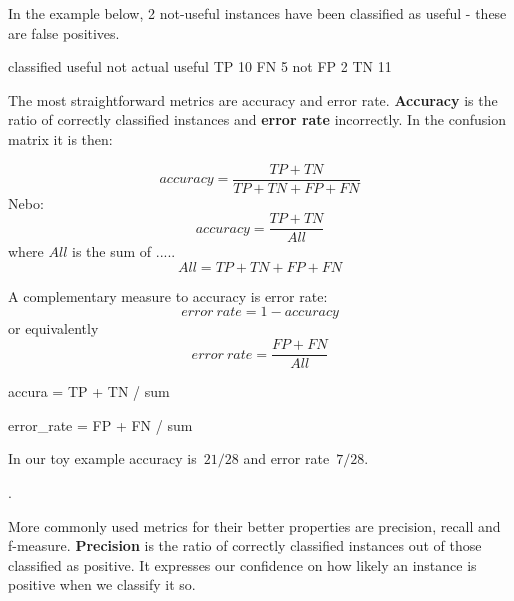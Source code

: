 
In the example below, 2 not-useful instances have been classified as useful -  these are false positives.

\begin{code}
        classified    useful       not
actual
useful                TP 10        FN  5
not                   FP  2        TN  11
\end{code}


The most straightforward metrics are accuracy and error rate.
{\bf Accuracy} is the ratio of correctly classified instances and {\bf error rate} incorrectly.
In the confusion matrix it is then:

\newcommand\TP{\mathit{TP}}  %
\newcommand\TN{\mathit{TN}}
\newcommand\FP{\mathit{FP}}
\newcommand\FN{\mathit{FN}}
\newcommand\ALL{\mathit{All}}
\begin{equation}
\mathit{accuracy} = \frac{\TP + \TN}{\TP + \TN + \FP + \FN}
\end{equation}
Nebo:
\begin{equation}
\mathit{accuracy} = \frac{\TP + \TN}{\ALL}
\end{equation}
where $\ALL$ is the sum of .....
\begin{equation}
\ALL = \TP + \TN + \FP + \FN
\end{equation}

A complementary measure to accuracy is error rate:
\begin{equation}
\mathit{error~rate} = 1 - \mathit{accuracy}
\end{equation}
or equivalently
\begin{equation}
\mathit{error~rate} = \frac{\FP + \FN}{\ALL}
\end{equation}



accura = TP + TN / sum

error\_rate = FP + FN / sum

In our toy example accuracy is~$21/28$ and error rate~$7/28$.

.

More commonly used metrics for their better properties are precision, recall and f-measure.
{\bf Precision} is the ratio of correctly classified instances out of those classified as positive.
It expresses our confidence on how likely an instance is positive when we classify it so.

